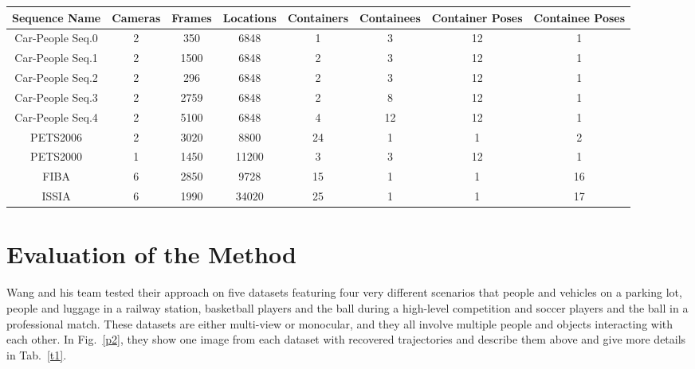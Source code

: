 \documentclass[10pt,twocolumn,letterpaper]{article}
\begin{document}
\begin{table*}
	\caption{Comparison of SimGAN to the state-of-the-art on the MPIIGaze dataset of real eyes. The second column indicates whether the methods are trained on Real/Synthetic data. The error the is mean eye gaze estimation error in degrees. Training on refined images results in a 2.1 degree improvement, a relative 21\% improvement compared to the state-of-the-art.}\label{t1}
	\begin{center}
		\begin{tabular}{|c|c|c|c|c|c|c|c|}
			\hline
			Sequence Name & Cameras &Frames&Locations& Containers& Containees& Container Poses& Containee Poses  \\
			\hline
			Car-People Seq.0 & 2 &350& 6848& 1& 3& 12& 1  \\
			\hline
			Car-People Seq.1 & 2 & 1500& 6848&2&3& 12& 1  \\
			\hline
			Car-People Seq.2 & 2 & 296& 6848&2&3& 12& 1  \\
			\hline
			Car-People Seq.3 & 2 & 2759&6848&2&8& 12& 1  \\
			\hline
		    Car-People Seq.4 & 2 & 5100&6848& 4& 12& 12& 1  \\
			\hline
			PETS2006 & 2 & 3020& 8800& 24& 1&1& 2  \\
			\hline
			PETS2000 & 1 & 1450& 11200& 3&3& 12&1 \\
			\hline
			FIBA & 6 & 2850& 9728& 15& 1& 1&16 \\
			\hline
			ISSIA & 6 & 1990&34020&25& 1& 1& 17  \\
			\hline
		\end{tabular}
	\end{center}
\end{table*}

\section{Evaluation of the Method}

Wang and his team tested their approach on five datasets featuring four very different scenarios that people and vehicles on a parking lot, people and luggage in a railway station, basketball players and the ball during a high-level competition and soccer players and the ball in a professional match. These datasets are either multi-view or monocular, and they all involve multiple people and objects interacting with each other. In Fig.~\ref{p2}, they show one image from each dataset with recovered trajectories and describe them above and give more details in Tab.~\ref{t1}.

{\small


}
\end{document}
